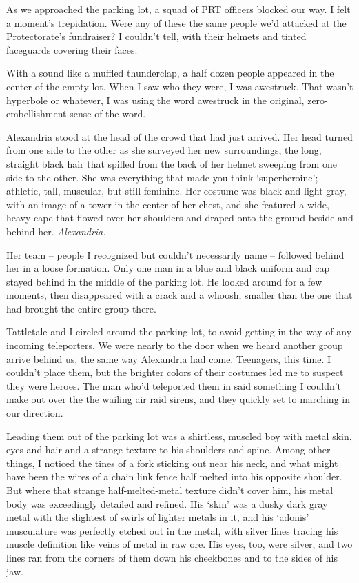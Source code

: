 As we approached the parking lot, a squad of PRT officers blocked our way.  I felt a moment's trepidation.  Were any of these the same people we'd attacked at the Protectorate's fundraiser?  I couldn't tell, with their helmets and tinted faceguards covering their faces.



With a sound like a muffled thunderclap, a half dozen people appeared in the center of the empty lot.  When I saw who they were, I was awestruck.  That wasn't hyperbole or whatever, I was using the word awestruck in the original, zero-embellishment sense of the word.



Alexandria stood at the head of the crowd that had just arrived.  Her head turned from one side to the other as she surveyed her new surroundings, the long, straight black hair that spilled from the back of her helmet sweeping from one side to the other.  She was everything that made you think `superheroine'; athletic, tall, muscular, but still feminine.  Her costume was black and light gray, with an image of a tower in the center of her chest, and she featured a wide, heavy cape that flowed over her shoulders and draped onto the ground beside and behind her.  \emph{Alexandria.  }



Her team – people I recognized but couldn't necessarily name – followed behind her in a loose formation.  Only one man in a blue and black uniform and cap stayed behind in the middle of the parking lot.  He looked around for a few moments, then disappeared with a crack and a whoosh, smaller than the one that had brought the entire group there.



Tattletale and I circled around the parking lot, to avoid getting in the way of any incoming teleporters.  We were nearly to the door when we heard another group arrive behind us, the same way Alexandria had come.  Teenagers, this time.  I couldn't place them, but the brighter colors of their costumes led me to suspect they were heroes.  The man who'd teleported them in said something I couldn't make out over the the wailing air raid sirens, and they quickly set to marching in our direction.



Leading them out of the parking lot was a shirtless, muscled boy with metal skin, eyes and hair and a strange texture to his shoulders and spine.  Among other things, I noticed the tines of a fork sticking out near his neck, and what might have been the wires of a chain link fence half melted into his opposite shoulder.  But where that strange half-melted-metal texture didn't cover him, his metal body was exceedingly detailed and refined.  His `skin' was a dusky dark gray metal with the slightest of swirls of lighter metals in it, and his `adonis' musculature was perfectly etched out in the metal, with silver lines tracing his muscle definition like veins of metal in raw ore.  His eyes, too, were silver, and two lines ran from the corners of them down his cheekbones and to the sides of his jaw.



